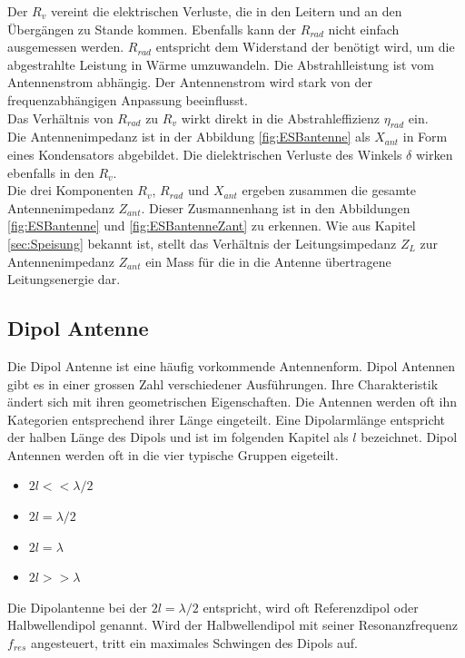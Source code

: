 Der $R_{v}$ vereint die elektrischen Verluste, die in den Leitern und an den Übergängen zu Stande kommen. Ebenfalls kann der $R_{rad}$ nicht einfach ausgemessen werden. $R_{rad}$ entspricht dem Widerstand der benötigt wird, um  die abgestrahlte Leistung in Wärme umzuwandeln. Die Abstrahlleistung ist vom Antennenstrom abhängig. Der Antennenstrom wird stark von der frequenzabhängigen Anpassung beeinflusst.\\
Das Verhältnis von $R_{rad}$  zu $R_{v}$ wirkt direkt in die Abstrahleffizienz $\eta_{rad}$ ein. \\
Die Antennenimpedanz ist in der Abbildung \ref{fig:ESBantenne} als $X_{ant}$ in Form eines Kondensators abgebildet. Die dielektrischen Verluste des Winkels $\delta$ wirken ebenfalls in den $R_{v}$.\\
Die drei Komponenten $R_{v}$, $R_{rad}$ und $X_{ant}$ ergeben zusammen die gesamte Antennenimpedanz $Z_{ant}$. Dieser Zusmannenhang ist  in den Abbildungen \ref{fig:ESBantenne} und \ref{fig:ESBantenneZant} zu erkennen. Wie aus Kapitel \ref{sec:Speisung} bekannt ist, stellt das Verhältnis der Leitungsimpedanz $Z_L$ zur Antennenimpedanz $Z_{ant}$ ein Mass für die in die Antenne übertragene Leitungsenergie dar.


\subsection{Dipol Antenne}
Die Dipol Antenne ist eine häufig vorkommende Antennenform.  Dipol Antennen gibt es in einer grossen Zahl verschiedener Ausführungen. Ihre Charakteristik ändert sich mit ihren geometrischen Eigenschaften. Die Antennen werden oft ihn Kategorien entsprechend ihrer Länge eingeteilt. Eine Dipolarmlänge entspricht der halben Länge des Dipols und ist im folgenden Kapitel als $l$ bezeichnet. Dipol Antennen werden oft in die  vier typische Gruppen eigeteilt. 
\begin{itemize}
\item $2l<< \lambda/2 $
\item $2l = \lambda/2 $
\item $2l = \lambda $
\item $2l>> \lambda $
\end{itemize} 
Die Dipolantenne bei der $2l=\lambda/2$ entspricht, wird oft Referenzdipol oder Halbwellendipol genannt. Wird der Halbwellendipol mit seiner Resonanzfrequenz $f_{res}$ angesteuert, tritt ein maximales Schwingen des Dipols auf. 


